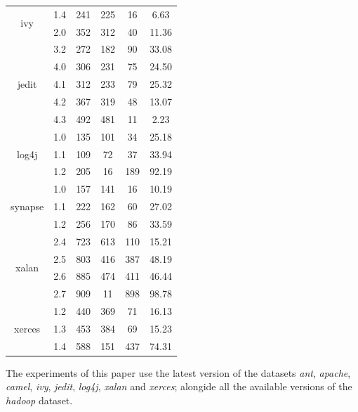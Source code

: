 \begin{center}
\begin{longtable}{ | c | c | c c c c | }
\hline
\multirow{2}{*}{ivy} &   
    1.4 &   241 &   225 &    16 &    6.63 \\
&   2.0 &   352 &   312 &    40 &   11.36 \\

\hline
\multirow{5}{*}{jedit} & 
    3.2 &   272 &   182 &    90 &   33.08 \\
&   4.0 &   306 &   231 &    75 &   24.50 \\
&   4.1 &   312 &   233 &    79 &   25.32 \\
&   4.2 &   367 &   319 &    48 &   13.07 \\
&   4.3 &   492 &   481 &    11 &    2.23 \\

\hline
\multirow{3}{*}{log4j} & 
    1.0 &   135 &   101 &    34 &   25.18 \\
&   1.1 &   109 &    72 &    37 &   33.94 \\
&   1.2 &   205 &    16 &   189 &   92.19 \\

\hline
\multirow{3}{*}{synapse} &
    1.0 &   157 &   141 &    16 &   10.19 \\
&   1.1 &   222 &   162 &    60 &   27.02 \\
&   1.2 &   256 &   170 &    86 &   33.59 \\

\hline
\multirow{4}{*}{xalan} & 
    2.4 &   723 &   613 &   110 &   15.21 \\
&   2.5 &   803 &   416 &   387 &   48.19 \\
&   2.6 &   885 &   474 &   411 &   46.44 \\
&   2.7 &   909 &    11 &   898 &   98.78 \\

\hline
\multirow{3}{*}{xerces} &
    1.2 &   440 &   369 &    71 &   16.13 \\
&   1.3 &   453 &   384 &    69 &   15.23 \\
&   1.4 &   588 &   151 &   437 &   74.31 \\
\hline

\end{longtable}
\end{center}

The experiments of this paper use the latest version of the datasets 
\textit{ant}, \textit{apache}, \textit{camel}, \textit{ivy},
\textit{jedit}, \textit{log4j}, \textit{xalan} and \textit{xerces}; alongide
all the available versions of the \textit{hadoop} dataset.

